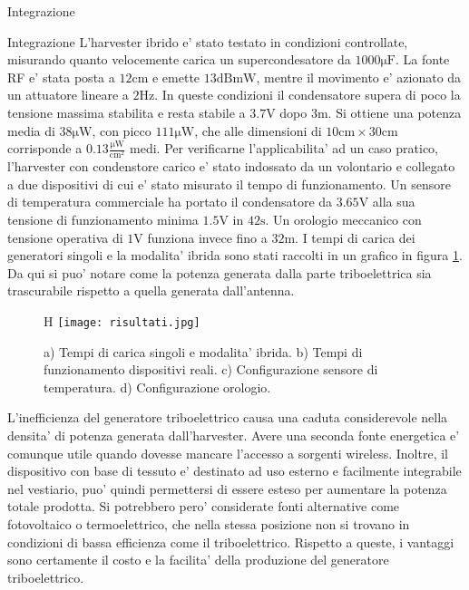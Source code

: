 \begin{section}{Integrazione}
    \begin{subsection}{Integrazione}
        L'harvester ibrido e' stato testato in condizioni controllate, misurando quanto velocemente carica un supercondesatore da \(1000\mathrm{\mu F}\). La fonte RF e' stata posta a \(12\mathrm{cm}\) e emette \(13\mathrm{dBmW}\), mentre il movimento e' azionato da un attuatore lineare a \(2\mathrm{Hz}\). In queste condizioni il condensatore supera di poco la tensione massima stabilita e resta stabile a \(3.7\mathrm{V}\) dopo \(3\mathrm{m}\). Si ottiene una potenza media di \(38\mathrm{\mu W}\), con picco \(111\mathrm{\mu W}\), che alle dimensioni di \(10\mathrm{cm}\times30\mathrm{cm}\) corrisponde a \(0.13\mathrm{ \frac{\mu W}{cm^2}}\) medi. Per verificarne l'applicabilita' ad un caso pratico, l'harvester con condenstore carico e' stato indossato da un volontario e collegato a due dispositivi di cui e' stato misurato il tempo di funzionamento. Un sensore di temperatura commerciale ha portato il condensatore da \(3.65\mathrm{V}\) alla sua tensione di funzionamento minima \(1.5\mathrm{V}\) in \(42\mathrm{s}\). Un orologio meccanico con tensione operativa di \(1\mathrm{V}\) funziona invece fino a \(32\mathrm{m}\).
        I tempi di carica dei generatori singoli e la modalita' ibrida sono stati raccolti in un grafico in figura \ref{fig:risultati}. Da qui si puo' notare come la potenza generata dalla parte triboelettrica sia trascurabile rispetto a quella generata dall'antenna.
        \begin{figure}{H}
            \texttt{[image: risultati.jpg]}
            \centering
            \caption{a) Tempi di carica singoli e modalita' ibrida. b) Tempi di funzionamento dispositivi reali. c) Configurazione sensore di temperatura. d) Configurazione orologio. \cite{kouWearableAllFabricHybrid2024}}
            \label{fig:risultati}
        \end{figure}
        L'inefficienza del generatore triboelettrico causa una caduta considerevole nella densita' di potenza generata dall'harvester. Avere una seconda fonte energetica e' comunque utile quando dovesse mancare l'accesso a sorgenti wireless. Inoltre, il dispositivo con base di tessuto e' destinato ad uso esterno e facilmente integrabile nel vestiario, puo' quindi permettersi di essere esteso per aumentare la potenza totale prodotta. Si potrebbero pero' considerate fonti alternative come fotovoltaico o termoelettrico, che nella stessa posizione non si trovano in condizioni di bassa efficienza come il triboelettrico. Rispetto a queste, i vantaggi sono certamente il costo e la facilita' della produzione del generatore triboelettrico.
    \end{subsection}



\end{section}